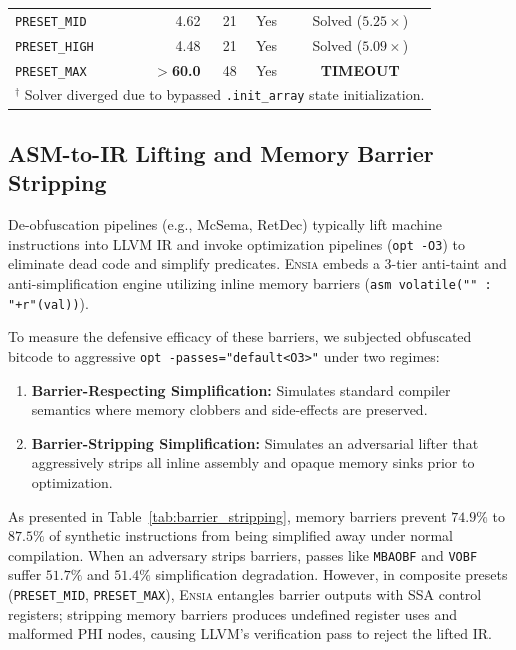 \documentclass[conference]{IEEEtran}
\begin{document}
\begin{table}[h]
\begin{tabular}{lrrcc}
\texttt{PRESET\_MID}   & 4.62              & 21                     & Yes                        & Solved ($5.25\times$) \\
\texttt{PRESET\_HIGH}  & 4.48              & 21                     & Yes                        & Solved ($5.09\times$) \\
\texttt{PRESET\_MAX}   & \textbf{$>$60.0}  & 48                     & Yes                        & \textbf{TIMEOUT} \\
\bottomrule
\multicolumn{5}{l}{\footnotesize $^\dagger$ Solver diverged due to bypassed \texttt{.init\_array} state initialization.}
\end{tabular}
\end{table}

\subsection{ASM-to-IR Lifting and Memory Barrier Stripping}
De-obfuscation pipelines (e.g., McSema, RetDec) typically lift machine instructions into LLVM IR and invoke optimization pipelines (\texttt{opt -O3}) to eliminate dead code and simplify predicates. \textsc{Ensia} embeds a 3-tier anti-taint and anti-simplification engine utilizing inline memory barriers (\texttt{asm volatile("" : "+r"(val))}). 

To measure the defensive efficacy of these barriers, we subjected obfuscated bitcode to aggressive \texttt{opt -passes="default<O3>"} under two regimes:
\begin{enumerate}
    \item \textbf{Barrier-Respecting Simplification:} Simulates standard compiler semantics where memory clobbers and side-effects are preserved.
    \item \textbf{Barrier-Stripping Simplification:} Simulates an adversarial lifter that aggressively strips all inline assembly and opaque memory sinks prior to optimization.
\end{enumerate}

As presented in Table~\ref{tab:barrier_stripping}, memory barriers prevent $74.9\%$ to $87.5\%$ of synthetic instructions from being simplified away under normal compilation. When an adversary strips barriers, passes like \texttt{MBAOBF} and \texttt{VOBF} suffer $51.7\%$ and $51.4\%$ simplification degradation. However, in composite presets (\texttt{PRESET\_MID}, \texttt{PRESET\_MAX}), \textsc{Ensia} entangles barrier outputs with SSA control registers; stripping memory barriers produces undefined register uses and malformed PHI nodes, causing LLVM's verification pass to reject the lifted IR.
\end{document}
